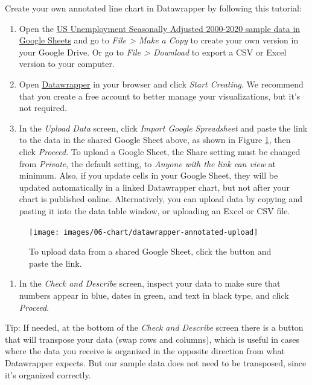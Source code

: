 \documentclass[
  english,
]{book}
\providecommand{\tightlist}{%
  \setlength{\itemsep}{0pt}\setlength{\parskip}{0pt}}
\begin{document}
Create your own annotated line chart in Datawrapper by following this tutorial:

\begin{enumerate}
\def\labelenumi{\arabic{enumi}.}
\item
  Open the \href{https://docs.google.com/spreadsheets/d/1mjUu4OfMjWfFP-miPiObi6vXzJUIMi1TSuoaT61FU6U/edit\#gid=821851972}{US Unemployment Seasonally Adjusted 2000-2020 sample data in Google Sheets} and go to \emph{File \textgreater{} Make a Copy} to create your own version in your Google Drive. Or go to \emph{File \textgreater{} Download} to export a CSV or Excel version to your computer.
\item
  Open \href{https://www.datawrapper.de}{Datawrapper} in your browser and click \emph{Start Creating}. We recommend that you create a free account to better manage your visualizations, but it's not required.
\item
  In the \emph{Upload Data} screen, click \emph{Import Google Spreadsheet} and paste the link to the data in the shared Google Sheet above, as shown in Figure \ref{fig:datawrapper-annotated-upload}, then click \emph{Proceed}. To upload a Google Sheet, the Share setting must be changed from \emph{Private}, the default setting, to \emph{Anyone with the link can view} at minimum. Also, if you update cells in your Google Sheet, they will be updated automatically in a linked Datawrapper chart, but not after your chart is published online. Alternatively, you can upload data by copying and pasting it into the data table window, or uploading an Excel or CSV file.
\end{enumerate}



\begin{figure}
\texttt{[image: images/06-chart/datawrapper-annotated-upload]} \caption{To upload data from a shared Google Sheet, click the button and paste the link.}\label{fig:datawrapper-annotated-upload}
\end{figure}

\begin{enumerate}
\def\labelenumi{\arabic{enumi}.}
\setcounter{enumi}{3}
\tightlist
\item
  In the \emph{Check and Describe} screen, inspect your data to make sure that numbers appear in blue, dates in green, and text in black type, and click \emph{Proceed}.
\end{enumerate}

Tip: If needed, at the bottom of the \emph{Check and Describe} screen there is a button that will transpose your data (swap rows and columns), which is useful in cases where the data you receive is organized in the opposite direction from what Datawrapper expects. But our sample data does not need to be transposed, since it's organized correctly.
\end{document}
